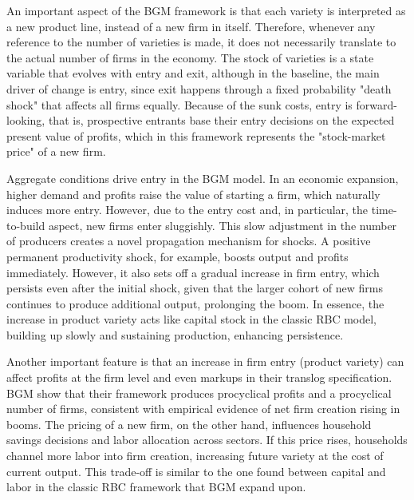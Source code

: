 \documentclass[a4paper,12pt]{article} %
\numberwithin{equation}{section} %
\numberwithin{figure}{section}
\numberwithin{table}{section}
\begin{document}
An important aspect of the BGM framework is that each variety is interpreted as a new product line, instead of a new firm in itself. Therefore, whenever any reference to the number of varieties is made, it does not necessarily translate to the actual number of firms in the economy. The stock of varieties is a state variable that evolves with entry and exit, although in the baseline, the main driver of change is entry, since exit happens through a fixed probability "death shock" that affects all firms equally. Because of the sunk costs, entry is forward-looking, that is, prospective entrants base their entry decisions on the expected present value of profits, which in this framework represents the "stock-market price" of a new firm. 

Aggregate conditions drive entry in the BGM model. In an economic expansion, higher demand and profits raise the value of starting a firm, which naturally induces more entry. However, due to the entry cost and, in particular, the time-to-build aspect, new firms enter sluggishly. This slow adjustment in the number of producers creates a novel propagation mechanism for shocks. A positive permanent productivity shock, for example, boosts output and profits immediately. However, it also sets off a gradual increase in firm entry, which persists even after the initial shock, given that the larger cohort of new firms continues to produce additional output, prolonging the boom. In essence, the increase in product variety acts like capital stock in the classic RBC model, building up slowly and sustaining production, enhancing persistence.

Another important feature is that an increase in firm entry (product variety) can affect profits at the firm level and even markups in their translog specification. BGM show that their framework produces procyclical profits and a procyclical number of firms, consistent with empirical evidence of net firm creation rising in booms. The pricing of a new firm, on the other hand, influences household savings decisions and labor allocation across sectors. If this price rises, households channel more labor into firm creation, increasing future variety at the cost of current output. This trade-off is similar to the one found between capital and labor in the classic RBC framework that BGM expand upon.
\end{document}
